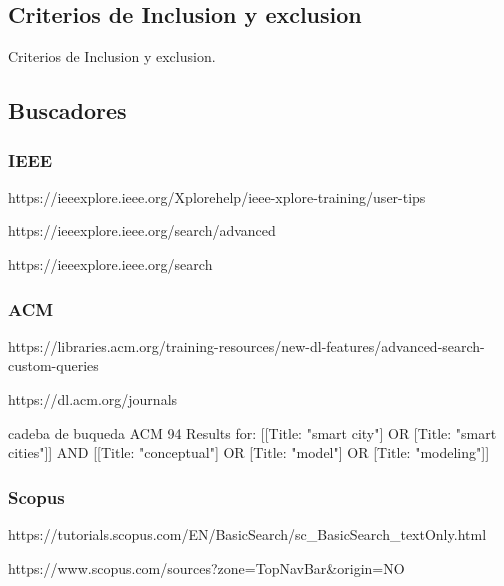 \documentclass[a4paper,fleqn,spanish]{cas-dc}
\begin{document}

\subsection{Criterios de Inclusion y exclusion}\label{criterio}

Criterios de Inclusion y exclusion.

\subsection{Buscadores}\label{fuentes}


\subsubsection{IEEE}\label{acm}

https://ieeexplore.ieee.org/Xplorehelp/ieee-xplore-training/user-tips

https://ieeexplore.ieee.org/search/advanced

https://ieeexplore.ieee.org/search

\subsubsection{ACM}\label{acm}

https://libraries.acm.org/training-resources/new-dl-features/advanced-search-custom-queries

https://dl.acm.org/journals

cadeba de buqueda ACM
94 Results for: [[Title: "smart city"] OR [Title: "smart cities"]] AND [[Title: "conceptual"] OR [Title: "model"] OR [Title: "modeling"]]

\subsubsection{Scopus}\label{acm}

https://tutorials.scopus.com/EN/BasicSearch/sc_BasicSearch_textOnly.html

https://www.scopus.com/sources?zone=TopNavBar&origin=NO%
\end{document}
